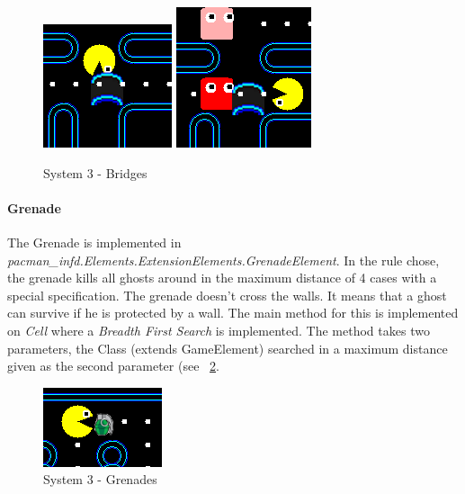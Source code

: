 \documentclass[]{article}
\begin{document}
\begin{figure}
\centering
    \includegraphics[width=.3\linewidth]{imgs/bridge1.PNG}
    \includegraphics[width=.3\linewidth]{imgs/bridge2.PNG}
    \caption{System 3 - Bridges}
    \label{fig:system3Bridge}
\end{figure}

\paragraph{Grenade} The Grenade is implemented in \textit{pacman\_infd.Elements.ExtensionElements.GrenadeElement}. In the rule chose, the grenade kills all ghosts around in the maximum distance of 4 cases with a special specification. The grenade doesn't cross the walls. It means that a ghost can survive if he is protected by a wall. The main method for this is implemented on \textit{Cell} where a \textit{Breadth First Search} is implemented. The method takes two parameters, the Class (extends GameElement) searched in a maximum distance given as the second parameter (see ~\ref{fig:system3Grenade}.

\begin{figure}
\centering
    \includegraphics[width=.4\linewidth]{imgs/grenadeBoard.PNG}
    \caption{System 3 - Grenades}
    \label{fig:system3Grenade}
\end{figure}
\end{document}
